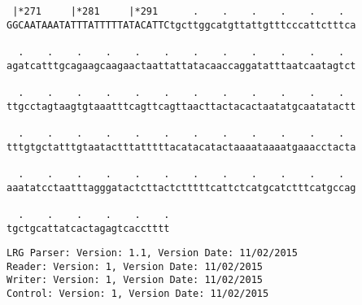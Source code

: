 \documentclass{article}
\begin{document}
\begin{Verbatim}
 |*271     |*281     |*291      .    .    .    .    .    .  
GGCAATAAATATTTATTTTTATACATTCtgcttggcatgttattgtttcccattctttca
  
  .    .    .    .    .    .    .    .    .    .    .    .  
agatcatttgcagaagcaagaactaattattatacaaccaggatatttaatcaatagtct
  
  .    .    .    .    .    .    .    .    .    .    .    .  
ttgcctagtaagtgtaaatttcagttcagttaacttactacactaatatgcaatatactt
  
  .    .    .    .    .    .    .    .    .    .    .    .  
tttgtgctatttgtaatactttatttttacatacatactaaaataaaatgaaacctacta
  
  .    .    .    .    .    .    .    .    .    .    .    .  
aaatatcctaatttagggatactcttactctttttcattctcatgcatctttcatgccag
  
  .    .    .    .    .    .
tgctgcattatcactagagtcacctttt
\end{Verbatim}
\newpage
\begin{Verbatim}
LRG Parser: Version: 1.1, Version Date: 11/02/2015
Reader: Version: 1, Version Date: 11/02/2015
Writer: Version: 1, Version Date: 11/02/2015
Control: Version: 1, Version Date: 11/02/2015
\end{Verbatim}
\end{document}
